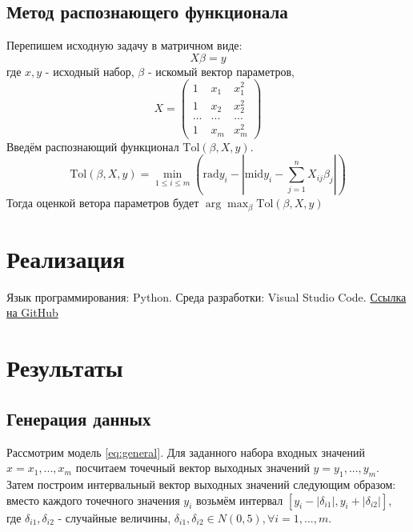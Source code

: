 \documentclass[a4paper,12pt]{article}
\begin{document}
    \subsection{Метод распознающего функционала}
    Перепишем исходную задачу в матричном виде:
    \begin{equation}
        X\beta = y
    \end{equation}
    где $ x, y $ - исходный набор, $ \beta $ - искомый вектор параметров,
    \begin{equation}
        X = 
        \begin{pmatrix}
            1 & x_{1} & x_{1}^2 \\
            1 & x_{2} & x_{2}^2 \\
            ... & ... & ... \\
            1 & x_{m} & x_{m}^2
        \end{pmatrix}
    \end{equation}
    \newline
    Введём распознающий функционал $ \text{Tol}(\beta, X, y) $.
    \begin{equation}
        \text{Tol}(\beta, X, y) = \min_{1 \leq i \leq m}(\text{rad}y_{i} - | \text{mid}y_{i} - \sum_{j = 1}^{n}X_{ij}\beta_{j} |)
    \end{equation}
    \newline
    Тогда оценкой ветора параметров будет $ \arg\max_{\beta}\text{Tol}(\beta, X, y) $
    
    \section{Реализация}
    Язык программирования: Python. Среда разработки: Visual Studio Code.
    \href{https://github.com/kirillkuks/IntervalAnalysis/tree/master/Coursework}{Ссылка на GitHub}

    \section{Результаты}
    \subsection{Генерация данных}
    Рассмотрим модель \ref{eq:general}. Для заданного набора входных значений $ x = {x_{1}, ..., x_{m}} $ посчитаем точечный вектор выходных значений $ y = {y_{1}, ..., y_{m}}$.
    Затем построим интервальный вектор выходных значений следующим образом: вместо каждого точечного значения $ y_{i} $ возьмём интервал $ [y_{i} - |\delta_{i1}|, y_{i} + |\delta_{i2}|] $,
    где $ \delta_{i1}, \delta_{i2} $ - случайные величины, $ \delta_{i1}, \delta_{i2} \in N(0, 5), \forall i = 1, ..., m $.
\end{document}
